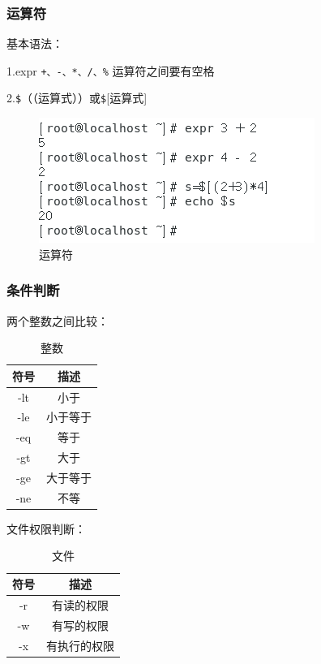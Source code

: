 \documentclass{ctexart}
\begin{document}
	\subsubsection{运算符}
	基本语法：
	
	1.expr \verb|+、-、*、/、%| 运算符之间要有空格
	
	2.\verb|$|（（运算式））或\verb|$|[运算式]
	
	\begin{figure}[H]
		\centering
		\includegraphics{2.16}
		\caption{运算符}
	\end{figure}
	
	\subsubsection{条件判断}
	
	两个整数之间比较：
	
	\begin{table}[h]
		\centering
		\caption{整数}
		\begin{tabular}{|c|c|}
			\hline
			符号 & 描述  \\
			\hline
			-lt & 小于 \\
			\hline
			-le & 小于等于\\
			\hline
			-eq &等于\\ 
			\hline
			-gt & 大于\\
			\hline
			-ge & 大于等于\\
			\hline
			-ne & 不等\\
			\hline
		\end{tabular}
	\end{table}
	
	文件权限判断：
	
	\begin{table}[h]
		\centering
		\caption{文件}
		\begin{tabular}{|c|c|}
			\hline
			符号 & 描述  \\
			\hline
			-r & 有读的权限 \\
			\hline
			-w & 有写的权限\\
			\hline
			-x &有执行的权限\\ 
			\hline
		\end{tabular}
	\end{table}
	
\end{document}
